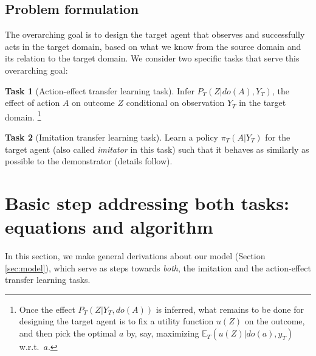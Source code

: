 \documentclass[letterpaper]{article} %
\theoremstyle{definition}%
\theoremstyle{definition}
\newtheorem{task}{Task}
\newcommand{\E}{\mathbb{E}}
\newcommand{\dob}[1]{do(#1)}
\newcommand{\Obs}{Y}
\newcommand{\obs}{y}
\newcommand{\Out}{Z}
\newcommand{\Dec}{Action-effect transfer learning task\xspace}
\newcommand{\todo}[1]{\textcolor{red}{#1}}
\newcommand{\defi}{\emph}
\begin{document}
\subsection{Problem formulation}
\label{sec:problem}


The overarching goal is to design the target agent that observes and successfully acts in the target domain, based on what we know from the source domain and its relation to the target domain.
We consider two specific tasks that serve this overarching goal:
\begin{task}[\Dec]
	\label{task:d}
	Infer $P_T(\Out|\dob{A}, Y_T)$, the effect of action $A$ on outcome $Z$ conditional on observation $Y_T$ in the target domain.%
	\footnote{Once the effect $P_T(\Out|Y_T, \dob{A})$ is inferred, what remains to be done for designing the target agent is to fix a utility function $u(\Out)$ on the outcome, and then pick the optimal $a$ by, say, maximizing $\E_T(u(\Out)|\dob{a}, y_T)$ w.r.t.\ $a$.}
\end{task}
\begin{task}[Imitation transfer learning task]
\label{task:i}
Learn a policy $\pi_T(A|\Obs_T)$ for the target agent (also called \defi{imitator} in this task) %
such that it behaves as similarly as possible to the demonstrator %
(details follow). 
\end{task}





\section{Basic step addressing both tasks: equations and algorithm}
\label{sec:general}

In this section, we make general derivations about our model (Section \ref{sec:model}), which serve as steps towards \emph{both}, the imitation and the action-effect transfer learning tasks.

\end{document}
